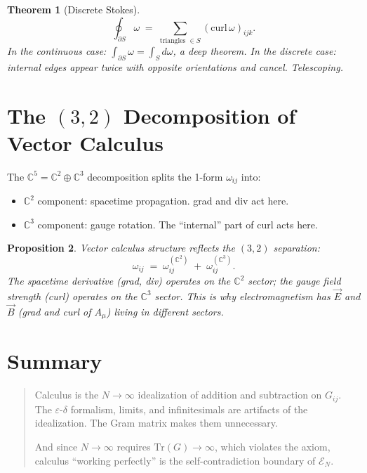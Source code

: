 \documentclass[11pt]{article}
\newtheorem{theorem}{Theorem}
\newtheorem{proposition}[theorem]{Proposition}
\begin{document}
\begin{theorem}[Discrete Stokes]
\[
  \oint_{\partial S} \omega \;=\;
  \sum_{\text{triangles } \in S} (\mathrm{curl}\,\omega)_{ijk}.
\]
In the continuous case: $\int_{\partial S} \omega = \int_S d\omega$,
a deep theorem. In the discrete case: internal edges appear
twice with opposite orientations and cancel. Telescoping.
\end{theorem}

\section{The $(3,2)$ Decomposition of Vector Calculus}

The $\mathbb{C}^5 = \mathbb{C}^2 \oplus \mathbb{C}^3$
decomposition splits the 1-form $\omega_{ij}$ into:
\begin{itemize}
  \item $\mathbb{C}^2$ component: spacetime propagation.
    grad and div act here.
  \item $\mathbb{C}^3$ component: gauge rotation.
    The ``internal'' part of curl acts here.
\end{itemize}

\begin{proposition}
Vector calculus structure reflects the $(3,2)$ separation:
\[
  \omega_{ij} \;=\; \omega_{ij}^{(\mathbb{C}^2)}
  \;+\; \omega_{ij}^{(\mathbb{C}^3)}.
\]
The spacetime derivative (grad, div) operates on the
$\mathbb{C}^2$ sector; the gauge field strength (curl)
operates on the $\mathbb{C}^3$ sector.
This is why electromagnetism has $\vec{E}$ and $\vec{B}$
(grad and curl of $A_\mu$) living in different sectors.
\end{proposition}

\section{Summary}

\begin{quote}
Calculus is the $N \to \infty$ idealization of addition and
subtraction on $G_{ij}$. The $\varepsilon$-$\delta$ formalism,
limits, and infinitesimals are artifacts of the idealization.
The Gram matrix makes them unnecessary.

And since $N \to \infty$ requires $\mathrm{Tr}(G) \to \infty$,
which violates the axiom, calculus ``working perfectly'' is
the self-contradiction boundary of $\mathcal{E}_N$.
\end{quote}
\end{document}
